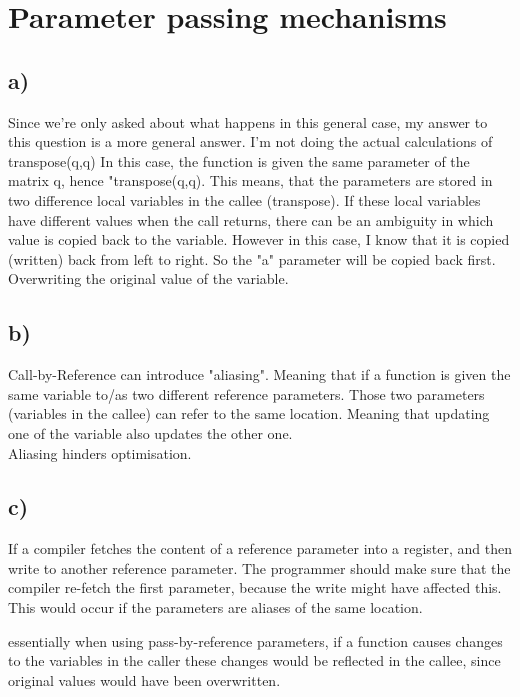 \section{Parameter passing mechanisms}
\subsection{a)}
Since we're only asked about what happens in this general case, my answer to this
question is a more general answer. I'm not doing the actual calculations of transpose(q,q)
In this case, the function is given the same parameter of the matrix q, hence "transpose(q,q).
This means, that the parameters are stored in two difference local variables in the callee (transpose).
If these local variables have different values when the call returns, there can be an ambiguity in which value is copied back to the variable.
However in this case, I know that it is copied (written) back from left to right.
So the "a" parameter will be copied back first. Overwriting the original value of the variable.

\subsection{b)}
Call-by-Reference can introduce "aliasing". Meaning that if a function is given the same variable to/as two different reference parameters.
Those two parameters (variables in the callee) can refer to the same location. Meaning that updating one of the variable also updates the other one.
\\
Aliasing hinders optimisation.

\subsection{c)}
If a compiler fetches the content of a reference parameter into a register, and then write to another reference parameter. 
The programmer should make sure that the compiler re-fetch the first parameter, because the write might have affected this.
This would occur if the parameters are aliases of the same location.

essentially when using pass-by-reference parameters, if a function causes changes to the variables in the caller
these changes would be reflected in the callee, since original values would have been overwritten.

